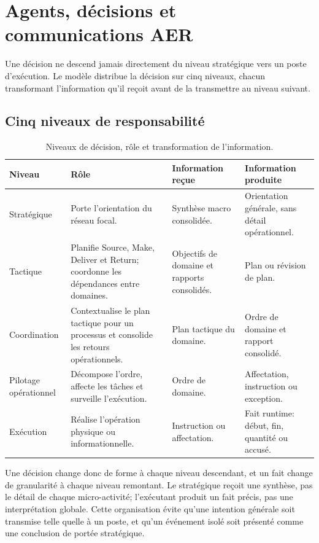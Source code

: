 \chapter{Agents, décisions et communications AER}
\label{chap:agents-aer}

Une décision ne descend jamais directement du niveau stratégique vers un poste d'exécution. Le modèle distribue la décision sur cinq niveaux, chacun transformant l'information qu'il reçoit avant de la transmettre au niveau suivant.


\section{Cinq niveaux de responsabilité}

\begin{table}[H]
  \centering
  \small
  \begin{tabularx}{\textwidth}{L{0.16\textwidth} L{0.20\textwidth} Y Y}
    \toprule
    Niveau & Rôle & Information reçue & Information produite \\
    \midrule
    Stratégique & Porte l'orientation du réseau focal. & Synthèse macro consolidée. & Orientation générale, sans détail opérationnel. \\
    Tactique & Planifie Source, Make, Deliver et Return; coordonne les dépendances entre domaines. & Objectifs de domaine et rapports consolidés. & Plan ou révision de plan. \\
    Coordination & Contextualise le plan tactique pour un processus et consolide les retours opérationnels. & Plan tactique du domaine. & Ordre de domaine et rapport consolidé. \\
    Pilotage opérationnel & Décompose l'ordre, affecte les tâches et surveille l'exécution. & Ordre de domaine. & Affectation, instruction ou exception. \\
    Exécution & Réalise l'opération physique ou informationnelle. & Instruction ou affectation. & Fait runtime: début, fin, quantité ou accusé. \\
    \bottomrule
  \end{tabularx}
  \caption{Niveaux de décision, rôle et transformation de l'information.}
  \label{tab:niveaux-agents}
\end{table}

Une décision change donc de forme à chaque niveau descendant, et un fait change de granularité à chaque niveau remontant. Le stratégique reçoit une synthèse, pas le détail de chaque micro-activité; l'exécutant produit un fait précis, pas une interprétation globale. Cette organisation évite qu'une intention générale soit transmise telle quelle à un poste, et qu'un événement isolé soit présenté comme une conclusion de portée stratégique.

